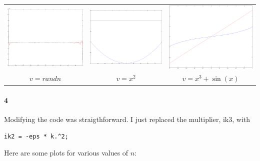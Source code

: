 \documentclass{article}
\begin{document}
\begin{center}
\begin{tabular}{ccc}
\includegraphics[width=2in]{plot2_1.png} &
\includegraphics[width=2in]{plot2_2.png} &
\includegraphics[width=2in]{plot2_3.png} \\
$v = randn$ & $v = x^2$ & $v = x^3 + \sin(x)$ \\
\end{tabular}
\end{center}

\paragraph{4}
Modifying the code was straigthforward.  I just replaced the multiplier, ik3, with
\begin{verbatim}
ik2 = -eps * k.^2;
\end{verbatim}
Here are some plots for various values of $n$:
\end{document}

